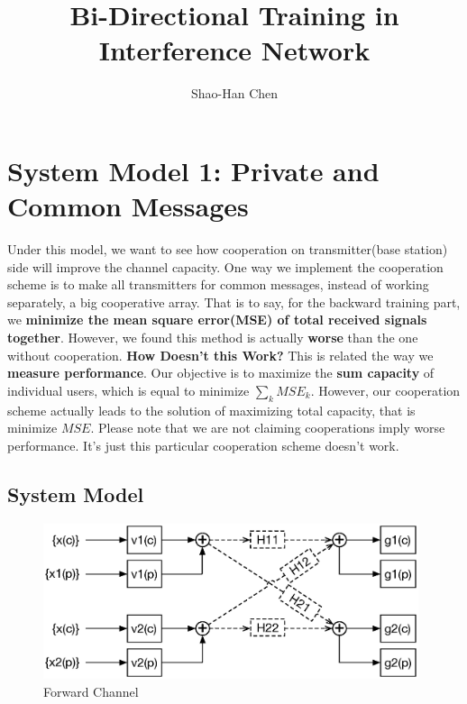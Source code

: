 \documentclass[11pt, oneside]{article}   	%
\begin{document}
\title{Bi-Directional Training in Interference Network}
\author{Shao-Han Chen}


\maketitle

\section{System Model 1: Private and Common Messages}

Under this model, we want to see how cooperation on transmitter(base station) side will improve the channel capacity. One way we implement the cooperation scheme is to make all transmitters for common messages, instead of working separately, a big cooperative array. That is to say, for the backward training part, we \textbf{minimize the mean square error(MSE) of total received signals together}. However, we found this method is actually \textbf{worse} than the one without cooperation. \textbf{How Doesn't this Work?} This is related the way we \textbf{measure performance}. Our objective is to maximize the \textbf{sum capacity} of individual users, which is equal to minimize $\displaystyle\sum_{k} MSE_{k}$. However, our cooperation scheme actually leads to the solution of maximizing total capacity, that is minimize $MSE$. Please note that we are not claiming cooperations imply worse performance. It's just this particular cooperation scheme doesn't work. 
\subsection{System Model}

\begin{figure}[h]
    \centering
    \centerline{\includegraphics[width=110mm]{forward_channel}}
    \caption{Forward Channel}
\end{figure} 
\end{document}
